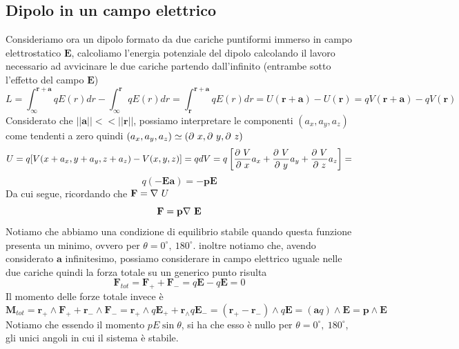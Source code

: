 \documentclass[
10pt, %
a4paper, %
oneside, %
headinclude,footinclude, %
BCOR5mm, %
]{scrartcl}
\begin{document}
\subsection{Dipolo in un campo elettrico}
Consideriamo ora un dipolo formato da due cariche puntiformi immerso in campo elettrostatico $\mathbf{E}$, calcoliamo l'energia potenziale del dipolo calcolando il lavoro necessario ad avvicinare le due cariche partendo dall'infinito (entrambe sotto l'effetto del campo $\mathbf{E}$)
\[L = \int_{\infty}^{\mathbf{r}+\mathbf{a}} qE(r) dr -\int_{\infty}^{\mathbf{r}} qE(r) dr =\int_{\mathbf{r}}^{\mathbf{r}+\mathbf{a}} qE(r) dr= U(\mathbf{r}+\mathbf{a})-U(\mathbf{r}) = qV(\mathbf{r}+\mathbf{a})-qV(\mathbf{r})\]
Considerato che $||\mathbf{a}||<<||\mathbf{r}||$, possiamo interpretare le componenti \((a_x, a_y, a_z)\) come tendenti a zero quindi \((a_x, a_y, a_z)\simeq (\partial\  x, \partial\  y, \partial\  z)\)
\[U = q[V(x+a_x, y+a_y, z+a_z)-V(x, y, z)] = qdV = q\left[\frac{\partial\  V}{\partial\  x} a_x + \frac{\partial\  V}{\partial\  y}a_y + \frac{\partial\  V}{\partial\  z}a_z\right] =\]
\[ q(-\mathbf{E}\mathbf{a}) = -\mathbf{p}\mathbf{E}\]
Da cui segue, ricordando che \(\mathbf{F} = \mathbf{\nabla\ } U\)
\[\mathbf{F} = \mathbf{p}\mathbf{\nabla\ }\mathbf{E}\]
Notiamo che abbiamo una condizione di equilibrio stabile quando questa funzione presenta un minimo, ovvero per \(\theta= 0^\circ,\ 180^\circ\). inoltre notiamo che, avendo considerato $\mathbf{a}$ infinitesimo, possiamo considerare in campo elettrico uguale nelle due cariche quindi la forza totale su un generico punto risulta 
\[\mathbf{F}_{tot} =\mathbf{F}_++\mathbf{F}_- = q\mathbf{E}-q\mathbf{E} = 0\]
Il momento delle forze totale invece è
\[\mathbf{M}_{tot} = \mathbf{r}_+\wedge\mathbf{F}_+ + \mathbf{r}_-\wedge\mathbf{F}_- = \mathbf{r}_+\wedge q\mathbf{E}_+ + \mathbf{r}_\wedge q\mathbf{E}_- = (\mathbf{r}_+ - \mathbf{r}_-)\wedge q \mathbf{E} = (\mathbf{a}q)\wedge\mathbf{E} = \mathbf{p}\wedge\mathbf{E}\]
Notiamo che essendo il momento \(pE\sin\theta\), si ha che esso è nullo per \(\theta= 0^\circ,\ 180^\circ\), gli unici angoli in cui il sistema è stabile. 
\end{document}
